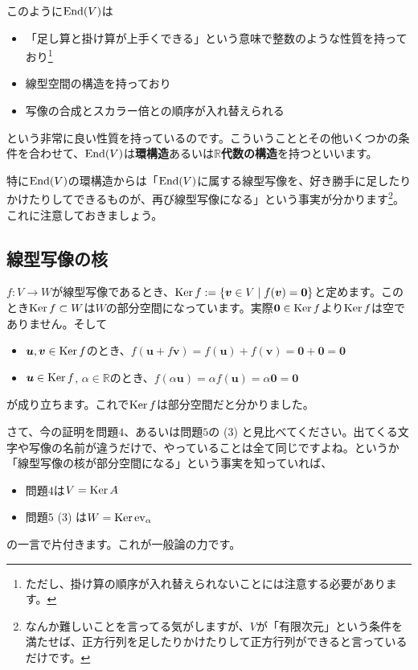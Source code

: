 このように$\operatorname{End}(V)$は
\begin{itemize}
\item 「足し算と掛け算が上手くできる」という意味で整数のような性質を持っており\footnote{ただし、掛け算の順序が入れ替えられないことには注意する必要があります。}
\item 線型空間の構造を持っており
\item 写像の合成とスカラー倍との順序が入れ替えられる
\end{itemize}
という非常に良い性質を持っているのです。こういうこととその他いくつかの条件を合わせて、$\operatorname{End}(V)$は\textbf{環構造}あるいは\textbf{$\mathbb{R}$代数の構造}を持つといいます。

特に$\operatorname{End}(V)$の環構造からは「$\operatorname{End}(V)$に属する線型写像を、好き勝手に足したりかけたりしてできるものが、再び線型写像になる」という事実が分かります\footnote{なんか難しいことを言ってる気がしますが、$V$が「有限次元」という条件を満たせば、正方行列を足したりかけたりして正方行列ができると言っているだけです。}。これに注意しておきましょう。

\subsection{線型写像の核}

$f\colon V\rightarrow W$が線型写像であるとき、$\operatorname{Ker} f:=\{\boldsymbol{v} \in V \mid f(\boldsymbol{v}) = \boldsymbol{0}\}$と定めます。このとき$\operatorname{Ker} f\subset W$は$W$の部分空間になっています。実際$\boldsymbol{0} \in \operatorname{Ker} f$より$\operatorname{Ker} f$は空でありません。そして
\begin{itemize}
\item $\boldsymbol{u}, \boldsymbol{v}\in \operatorname{Ker} f$のとき、$f(\bm{u} + f\bm{v}) = f(\bm{u}) + f(\bm{v}) = \bm{0} + \bm{0} = \bm{0}$
\item $\boldsymbol{u} \in \operatorname{Ker} f$, $\alpha\in\mathbb{R}$のとき、$f(\alpha\bm{u}) = \alpha f(\bm{u}) = \alpha \bm{0} = \bm{0}$
\end{itemize}
が成り立ちます。これで$\operatorname{Ker} f$は部分空間だと分かりました。

さて、今の証明を問題$4$、あるいは問題$5$の (3) と見比べてください。出てくる文字や写像の名前が違うだけで、やっていることは全て同じですよね。というか「線型写像の核が部分空間になる」という事実を知っていれば、
\begin{itemize}
\item 問題$4$は$V = \operatorname{Ker} A$
\item 問題$5$ (3) は$W = \operatorname{Ker} \operatorname{ev}_{\alpha}$
\end{itemize}
の一言で片付きます。これが一般論の力です。

